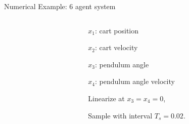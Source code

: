 \documentclass[10pt]{beamer}
\begin{document}
\begin{frame}{Numerical Example: 6 agent system}
  \centering
  \begin{columns}
    \begin{column}{0.5\textwidth}
      \scalebox{0.7}{}
    \end{column}
    \begin{column}{0.5\textwidth}
      $x_1$: cart position

      $x_2$: cart velocity

      $x_3$: pendulum angle

      $x_4$: pendulum angle velocity

      Linearize at $x_3=x_4=0$, 

      Sample with interval $T_s=0.02$.
    \end{column}
  \end{columns}


\end{frame}
\end{document}
